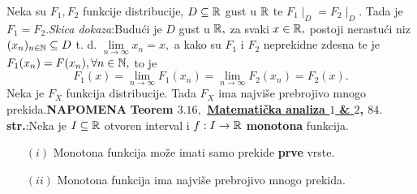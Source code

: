\documentclass{article}
\begin{document}
Neka su \(F_1,F_2\) funkcije distribucije, \(D\subseteq\Bbb R\) gust u \(\Bbb R\) te \(F_1\mid_D=F_2\mid_D.\) Tada je \(F_1=F_2.\)\newline\textit{Skica dokaza}:\newline Budući je \(D\) gust u \(\Bbb R,\) za svaki \(x\in\Bbb R,\) postoji nerastući niz \((x_n)_{n\in\Bbb N}\subseteq D\) t. d. \(\lim\limits_{n\to\infty}x_n=x,\) a kako su \(F_1\) i \(F_2\) neprekidne zdesna te je \(F_1(x_n)=F(x_n),\forall n\in\Bbb N,\) to je \[F_1(x)=\lim\limits_{n\to\infty}F_1(x_n)=\lim\limits_{n\to\infty}F_2(x_n)=F_2(x).\] Neka je \(F_X\) funkcija distribucije. Tada \(F_X\) ima najviše prebrojivo mnogo prekida.\newline\newline {}\textbf{NAPOMENA} \textbf{Teorem \(3.16,\) \href{https://web.math.pmf.unizg.hr/~guljas/skripte/MATANALuR.pdf}{Matematička analiza \(1\) \& \(2\)}, \(84.\) str.}:\newline Neka je \(I\subseteq\Bbb R\) otvoren interval i \(f:I\to\Bbb R\) \textbf{monotona} funkcija.
\begin{enumerate}
    \item[\((i)\)] Monotona funkcija može imati samo prekide \textbf{prve} vrste.
    \item[\((ii)\)] Monotona funkcija ima najviše prebrojivo mnogo prekida.
\end{enumerate}
\end{document}
